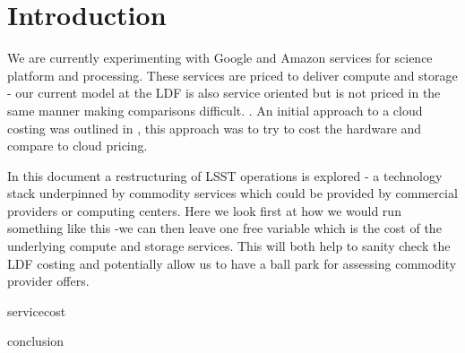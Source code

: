 \section{Introduction} \label{sec:intro}

We are currently experimenting with Google and Amazon services for science platform and processing.
These services are priced to deliver compute and storage - our current model at the \gls{LDF} is also service oriented but
is not priced in the same manner making comparisons difficult. 
. An initial approach to a \gls{cloud} costing was outlined in , this approach was to try to cost the hardware and compare to \gls{cloud} pricing.

In this document a restructuring of \gls{LSST} operations is explored - a technology stack underpinned by commodity services which could be provided by commercial providers or computing centers. Here we look first at how we would run something like this -we can then leave one free variable which is the cost of the underlying compute and storage services. This will both help to
sanity check the \gls{LDF} costing and potentially allow us to have a ball park for assessing commodity provider offers.




 {servicecost}


 {conclusion}


